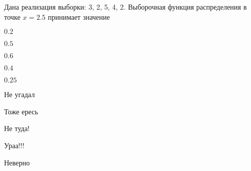 
\begin{question}
Дана реализация выборки: 3, 2, 5, 4, 2. Выборочная функция распределения
в точке \(x=2.5\) принимает значение
\begin{answerlist}
  \item \(0.2\)
  \item \(0.5\)
  \item \(0.6\)
  \item \(0.4\)
  \item \(0.25\)
\end{answerlist}
\end{question}

\begin{solution}
\begin{answerlist}
  \item Не угадал
  \item Тоже ересь
  \item Не туда!
  \item Ураа!!!
  \item Неверно
\end{answerlist}
\end{solution}

